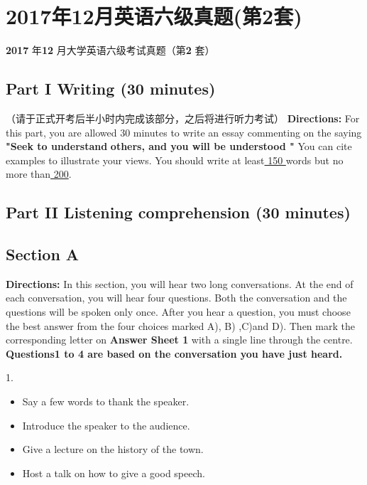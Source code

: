 \documentclass[UTF8,11pt]{ctexart}
\begin{document}
\section*{2017年12月英语六级真题(第2套)}
\textbf{2017} 年\textbf{12} 月大学英语六级考试真题（第\textbf{2} 套）


\subsection*{\textbf{Part I} \textbf{Writing} \textbf{(30 minutes)}}


（请于正式开考后半小时内完成该部分，之后将进行听力考试） \textbf{Directions:} For this part, you are allowed 30 minutes to write an essay commenting on the saying\textbf{ "Seek to understand} \textbf{others, and you will be understood "} You can cite examples to illustrate your views. You should write at least\uline{ 150 }words but no more than\uline{ 200}.


\subsection*{\textbf{Part II} \textbf{Listening comprehension} \textbf{(30 minutes)}}


\subsection*{\textbf{Section A}}


\textbf{Directions:} In this section, you will hear two long conversations. At the end of each conversation, you will hear four questions. Both the conversation and the questions will be spoken only once. After you hear a question, you must choose the best answer from the four choices marked A), B) ,C)and D). Then mark the corresponding letter on\textbf{ Answer Sheet 1} with a single line through the centre. \textbf{Questions1 to 4 are based on the conversation you have just heard.}


1.


\begin{itemize}[leftmargin=2em,itemsep=.2em,topsep=.4em]\item[A.] Say a few words to thank the speaker.
\item[B.] Introduce the speaker to the audience.
\item[C.] Give a lecture on the history of the town.
\item[D.] Host a talk on how to give a good speech.
\end{itemize}
\end{document}
